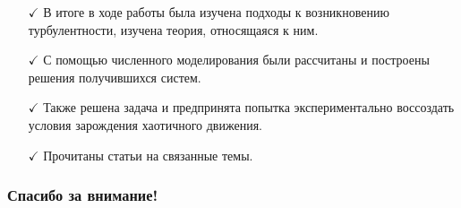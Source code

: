 \begin{frame}
	\begin{itemize}
	\item[$\checkmark$] В итоге в ходе работы была изучена подходы к возникновению турбулентности, изучена теория, относящаяся к ним.
	\item[$\checkmark$] С помощью численного моделирования были рассчитаны и построены решения получившихся систем.
	\item[$\checkmark$] Также решена задача и предпринята попытка экспериментально воссоздать условия зарождения хаотичного движения.
	\item[$\checkmark$] Прочитаны статьи на связанные темы.
	\end{itemize}
\end{frame}

\begin{frame}
	\frametitle{Спасибо за внимание!}
\end{frame}
